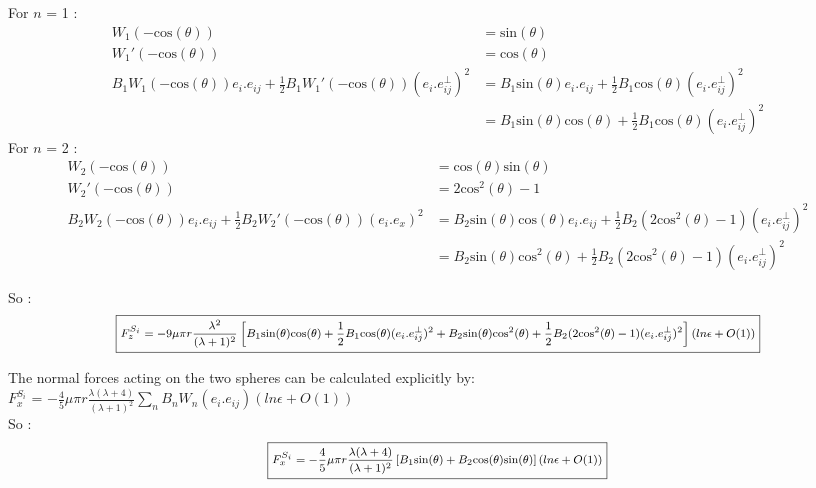 \documentclass{article}
\begin{document}
For $n$ = 1 : \begin{align*}
    W_1(\mathrm{-cos}(\theta)) &= \mathrm{sin}(\theta) \\
    W_1'(\mathrm{-cos}(\theta)) &= \mathrm{cos}(\theta) \\
    B_1 W_1(\mathrm{-cos}(\theta))e_i.e_{ij}+ \frac{1}{2} B_1  W_1'(\mathrm{-cos}(\theta)) (e_i.e^{\perp}_{ij})^2  &= B_1 \mathrm{sin}(\theta)e_i.e_{ij} + \frac{1}{2} B_1  \mathrm{cos}(\theta) (e_i.e^{\perp}_{ij})^2 \\
    &= B_1 \mathrm{sin}(\theta)\mathrm{cos}(\theta) + \frac{1}{2} B_1  \mathrm{cos}(\theta) (e_i.e^{\perp}_{ij})^2
\end{align*} 
For $n$ = 2 : \begin{align*}
    W_2(\mathrm{-cos}(\theta)) &= \mathrm{cos}(\theta)\mathrm{sin}(\theta) \\
    W_2'(\mathrm{-cos}(\theta)) &= 2\mathrm{cos}^2(\theta) - 1\\
    B_2 W_2(\mathrm{-cos}(\theta))e_i.e_{ij}+ \frac{1}{2} B_2  W_2'(\mathrm{-cos}(\theta)) (e_i.e_x)^2  &= B_2 \mathrm{sin}(\theta)\mathrm{cos}(\theta)e_i.e_{ij} + \frac{1}{2} B_2(2\mathrm{cos}^2(\theta) - 1) (e_i.e^{\perp}_{ij})^2 \\
    &= B_2 \mathrm{sin}(\theta)\mathrm{cos}^2(\theta) + \frac{1}{2} B_2(2\mathrm{cos}^2(\theta) - 1) (e_i.e^{\perp}_{ij})^2
\end{align*}  

So :
\begin{equation*}
\footnotesize
\boxed{
    F_z^{S_i} = -9 \mu \pi r \frac{\lambda ^2}{(\lambda +1)^2} \left[ B_1 \mathrm{sin}(\theta)\mathrm{cos}(\theta) + \frac{1}{2} B_1  \mathrm{cos}(\theta) (e_i.e^{\perp}_{ij})^2 +B_2 \mathrm{sin}(\theta)\mathrm{cos}^2(\theta) + \frac{1}{2} B_2(2\mathrm{cos}^2(\theta) - 1) (e_i.e^{\perp}_{ij})^2\right](ln \epsilon + O(1))}
\end{equation*}
\normalsize
\vspace{0.5cm}

The normal forces acting on the two spheres can be calculated explicitly by: \\
 $F_x^{S_i}$ = $-\frac{4}{5} \mu \pi r \frac{\lambda(\lambda +4)}{(\lambda +1)^2} \sum_{n} B_n W_n(e_i.e_{ij}) (ln \epsilon + O(1))$ \cite{Brumley}
\\ So :
\begin{equation*}
    \footnotesize
    \boxed{F_x^{S_i} = -\frac{4}{5} \mu \pi r \frac{\lambda(\lambda +4)}{(\lambda +1)^2} \left[ B_1\mathrm{sin}(\theta) +B_2\mathrm{cos}(\theta)\mathrm{sin}(\theta)\right] (ln \epsilon + O(1))}
\end{equation*}
\end{document}
